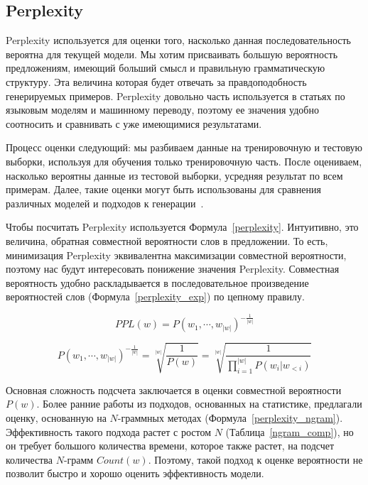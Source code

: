 \documentclass{spbau-diploma}
\begin{document}
\subsection{Perplexity}
Perplexity используется для оценки того, насколько данная последовательность 
вероятна для текущей модели. Мы хотим присваивать большую вероятность 
предложениям, имеющий больший смысл и правильную грамматическую структуру. 
Эта величина которая будет отвечать за правдоподобность генерируемых примеров. 
Perplexity довольно часть используется в статьях по языковым моделям и машинному 
переводу, поэтому ее значения удобно соотносить и 
сравнивать с уже имеющимися результатами.

Процесс оценки следующий: мы разбиваем данные на тренировочную и тестовую 
выборки, используя для обучения только тренировочную часть. После оцениваем,
насколько вероятны данные из тестовой выборки, усредняя результат по всем 
примерам. Далее, такие оценки могут быть использованы для сравнения различных 
моделей и подходов к генерации~\cite{lecture:lm}.

Чтобы посчитать Perplexity используется Формула~\ref{perplexity}. Интуитивно,
это величина, обратная совместной вероятности слов в предложении. То есть, 
минимизация Perplexity эквивалентна максимизации совместной вероятности, поэтому
нас будут интересовать понижение значения Perplexity. Совместная вероятность 
удобно раскладывается в последовательное произведение вероятностей слов 
(Формула~\ref{perplexity_exp}) по цепному правилу.

\begin{equation}
\label{perplexity}
PPL(w) = P(w_1, \cdots, w_{|w|}) ^ {-\frac{1}{|w|}}
\end{equation}

\begin{equation}
\label{perplexity_exp}
P(w_1, \cdots, w_{|w|}) ^ {-\frac{1}{|w|}} = \sqrt[|w|]{\frac{1}{P(w)}} = 
\sqrt[|w|]{\frac{1}{\prod^{|w|}_{i=1}{P(w_i | w_{<i})}}}
\end{equation}

Основная сложность подсчета заключается в оценки совместной вероятности $P(w)$.
Более ранние работы из подходов, основанных на статистике, предлагали оценку, 
основанную на $N$-граммных методах (Формула~\ref{perplexity_ngram}). 
Эффективность такого подхода растет с ростом $N$ (Таблица~\ref{ngram_comp}), 
но он требует большого количества времени, которое также растет, на подсчет 
количества $N$-грамм $Count(w)$. 
Поэтому, такой подход к оценке вероятности не позволит быстро и хорошо оценить 
эффективность модели.
\end{document}
